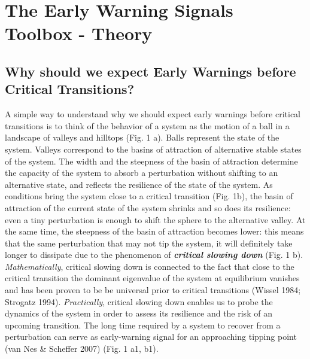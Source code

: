 \documentclass[12pt,a4paper,final]{article}
\begin{document}
\section{The Early Warning Signals Toolbox - Theory} 

\subsection{Why should we expect Early Warnings before Critical Transitions?}
A simple way to understand why we should expect early warnings before critical transitions is to think of the behavior of a system as the motion of a ball in a landscape of valleys and hilltops (Fig. 1 a). Balls represent the state of the system. Valleys correspond to the basins of attraction of alternative stable states of the system. The width and the steepness of the basin of attraction determine the capacity of the system to absorb a perturbation without shifting to an alternative state, and reflects the resilience of the state of the system. As conditions bring the system close to a critical transition (Fig. 1b), the basin of attraction of the current state of the system shrinks and so does its resilience: even a tiny perturbation is enough to shift the sphere to the alternative valley. At the same time, the steepness of the basin of attraction becomes lower: this means that the same perturbation that may not tip the system, it will definitely take longer to dissipate due to the phenomenon of \textit{\textbf{critical slowing down}} (Fig. 1 b). \textit{Mathematically}, critical slowing down is connected to the fact that close to the critical transition the dominant eigenvalue of the system at equilibrium vanishes and has been proven to be be universal prior to critical transitions  (Wissel 1984; Strogatz 1994). \textit{Practically}, critical slowing down enables us to probe the dynamics of the system in order to assess its resilience and the risk of an upcoming transition. The long time required by a system to recover from a perturbation can serve as early-warning signal for an approaching tipping point (van Nes \& Scheffer 2007) (Fig. 1 a1, b1).
\end{document}
